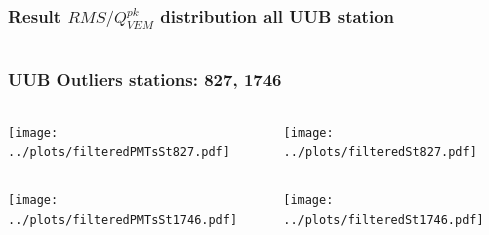 \documentclass[aspectratio=169]{beamer}
\begin{document}
\begin{frame}
  \frametitle{Result $RMS/Q^{pk}_{VEM}$ distribution all UUB station}
  \vspace{0.5cm}
  \begin{columns}
    \begin{column}{.8\textwidth}
    \end{column}
  \end{columns}
\end{frame}

\begin{frame}
  \frametitle{UUB Outliers stations: 827, 1746}
  \vspace{0.5cm}
  \begin{columns}
    \begin{column}{0.5\textwidth}
      \texttt{[image: ../plots/filteredPMTsSt827.pdf]}
    \end{column}
    \begin{column}{0.5\textwidth}
      \texttt{[image: ../plots/filteredSt827.pdf]}
    \end{column}
  \end{columns}
  \begin{columns}
    \begin{column}{0.5\textwidth}
      \texttt{[image: ../plots/filteredPMTsSt1746.pdf]}
    \end{column}
    \begin{column}{0.5\textwidth}
      \texttt{[image: ../plots/filteredSt1746.pdf]}
    \end{column}
  \end{columns}
\end{frame}
\end{document}
